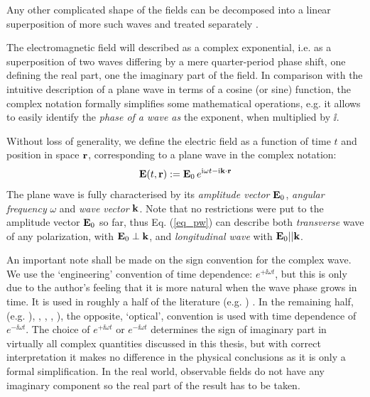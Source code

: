 Any other complicated shape of the fields can be decomposed into a linear superposition of more such waves and treated separately \cite{jackson1962book}. 

The electromagnetic field will described as a complex exponential, i.e. as a superposition of two waves differing by a mere quarter-period phase shift, one defining the real part, one the imaginary part of the field. In comparison with the intuitive description of a plane wave in terms of a cosine (or sine) function, the complex notation formally simplifies some mathematical operations, e.g. it allows to easily identify the \textit{phase of a wave as} the exponent, when multiplied by $\ii$. 

 

Without loss of generality, we define the electric field as a function of time $t$ and position in space ${\mathbf{r}}$, corresponding to a plane wave in the complex notation:
\begin{equation} \mathbf{E}(t, {\mathbf{r}}) := \mathbf{E}_0\, e^{{\mathrm i}\omega t - {\mathrm i}{\mathbf{k}}\cdot{\mathbf{r}}} \label{eq_pw}\end{equation}
The plane wave is fully characterised by its \textit{amplitude vector} $\mathbf{E}_0$, \textit{angular frequency} $\omega$ and \textit{wave vector} ${\mathbf{k}}$. Note that no restrictions were put to the amplitude vector $\mathbf{E}_0$ so far, thus Eq. (\ref{eq_pw}) can describe both \textit{transverse} wave of any polarization, with $\mathbf{E}_0 \perp {\mathbf{k}}$, and \textit{longitudinal wave} with $\mathbf{E}_0 || {\mathbf{k}}$.

An important note shall be made on the sign convention for the complex wave. 
We use the `engineering' convention of time dependence: $e^{+\ii \omega t}$, but this is only due to the author's feeling that it is more natural when the wave phase grows in time. 
It is used in  roughly a half of the literature 
(e.g. \cite[p. 9]{engheta2006book}
\cite[pp. 21, 99]{krowne2007book}
\cite[chap. 1-4, 6, 9, 10]{eleftheriades2005book})
.  In the remaining half,
(e.g. \cite[chap. 5, 7, 8]{eleftheriades2005book}),
\cite{jackson1962book}, 
\cite{veselago1968},
\cite{born1999book}, \cite[p. 5]{noginov2011book}), 
the opposite, `optical', convention is used with time dependence of $e^{-\ii \omega t}$. 
The choice of $e^{+\ii\omega t}$ or $e^{-\ii\omega t}$ determines the sign of imaginary part in virtually all complex quantities discussed in this thesis, but with correct interpretation it makes no difference in the physical conclusions as it is only a formal simplification.
In the real world, observable fields do not have any imaginary component so the real part of the result has to be taken. 

